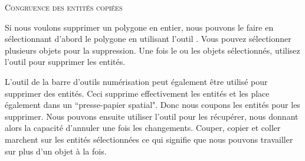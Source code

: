 \begin{itemize}
\begin{Astuce}[ht]\caption{\textsc{Congruence des entités copiées}}
\end{Astuce}


Si nous voulons supprimer un polygone en entier, nous pouvons le faire en sélectionnant d'abord le polygone en utilisant l'outil . Vous pouvez sélectionner plusieurs objets pour la suppression. Une fois le ou les objets sélectionnés, utilisez l'outil  pour supprimer les entités.

L'outil  de la barre d'outils numérisation peut également être utilisé pour supprimer des entités. Ceci supprime effectivement les entités et les place également dans un ``presse-papier spatial". Donc nous coupons les entités pour les supprimer. Nous pouvons ensuite utiliser l'outil  pour les récupérer, nous donnant alors la capacité d'annuler une fois les changements. Couper, copier et coller marchent sur les entités sélectionnées ce qui signifie que nous pouvons travailler sur plus d'un objet à la fois.


\end{itemize}
